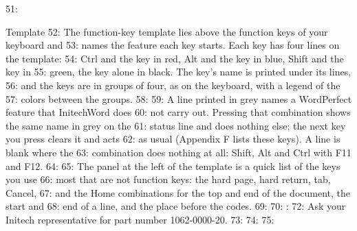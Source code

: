51: \begin{Feature}{Template}
52: The function-key template lies above the function keys of your keyboard and
53: names the feature each key starts.  Each key has four lines on the template:
54: Ctrl and the key in red, Alt and the key in blue, Shift and the key in
55: green, the key alone in black.  The key's name is printed under its lines,
56: and the keys are in groups of four, as on the keyboard, with a legend of the
57: colors between the groups.
58: 
59: A line printed in grey names a WordPerfect feature that InitechWord does
60: not carry out.  Pressing that combination shows the same name in grey on the
61: status line and does nothing else; the next key you press clears it and acts
62: as usual (Appendix F lists these keys).  A line is blank where the
63: combination does nothing at all: Shift, Alt and Ctrl with F11 and F12.
64: 
65: The panel at the left of the template is a quick list of the keys you use
66: most that are not function keys: the hard page, hard return, tab, Cancel,
67: and the Home combinations for the top and end of the document, the start and
68: end of a line, and the place before the codes.
69: 
70: : 
72: Ask your Initech representative for part number 1062-0000-20.
73: 
74: 
75: \end{Feature}
